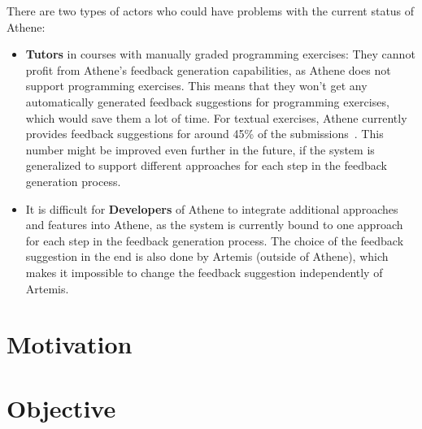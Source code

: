There are two types of actors who could have problems with the current status of Athene:
\begin{itemize}
    \item \textbf{Tutors} in courses with manually graded programming exercises: They cannot profit from Athene's feedback generation capabilities, as Athene does not support programming exercises. This means that they won't get any automatically generated feedback suggestions for programming exercises, which would save them a lot of time.
    For textual exercises, Athene currently provides feedback suggestions for around 45\% of the submissions~\cite{cofee2}. This number might be improved even further in the future, if the system is generalized to support different approaches for each step in the feedback generation process.
    \item It is difficult for \textbf{Developers} of Athene to integrate additional approaches and features into Athene, as the system is currently bound to one approach for each step in the feedback generation process. The choice of the feedback suggestion in the end is also done by Artemis (outside of Athene), which makes it impossible to change the feedback suggestion independently of Artemis.
\end{itemize}

\section*{Motivation}

\section*{Objective}
        
